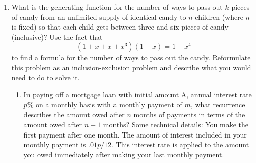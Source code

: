 \begin{enumerate}
\itemih (A challenge; the author has not tried to solve this one!)  Redo
Problem \ref{Hora} in the case that there are $n$ men and $n$ women and
when people arrange themselves in a circle they do so alternating gender.

\item  What is the generating function for the number of ways to pass out
 $k$ pieces of candy from
an unlimited supply of identical candy to  $n$ children (where
$n$ is fixed) so that each child gets between three and six pieces of
candy (inclusive)?  Use the fact that
$$(1+x+x+x^3)(1-x) = 1-x^4$$ to find a formula for the number of ways to
pass out the candy.  Reformulate this problem as an inclusion-exclusion
problem and describe what you would need to do to solve it.

\itemm
\begin{enumerate}
\item In paying off a mortgage loan with initial amount A,
annual interest rate
$p$\% on a monthly basis with a monthly payment of $m$, what recurrence
describes the amount owed after $n$ months of payments in terms of the
amount owed after $n-1$ months?  Some technical details:  You make the
first payment after one month.  The amount of interest included in your
monthly payment is $.01p/12$.  This interest rate is applied to the amount
you owed immediately after making your last monthly payment.  


\end{enumerate}
\end{enumerate}
